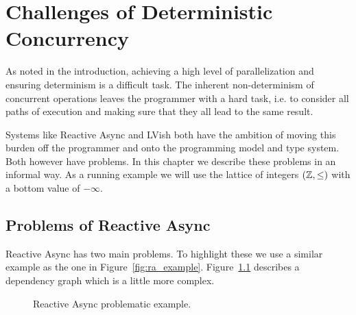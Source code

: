 \chapter{Challenges of Deterministic Concurrency}
\label{cha:challenges}





As noted in the introduction, achieving a high level of parallelization and
ensuring determinism is a difficult task. The inherent non-determinism of
concurrent operations leaves the programmer with a hard task, i.e. to consider
all paths of execution and making sure that they all lead to the same result.

Systems like Reactive Async and LVish both have the ambition of moving this
burden off the programmer and onto the programming model and type system. Both
however have problems. In this chapter we describe these problems in an informal
way. As a running example we will use the lattice of integers $(\mathbb{Z},
\leq)$ with a bottom value of $-\infty$.

\section{Problems of Reactive Async}%
\label{sec:problems_of_reactive_async}

Reactive Async has two main problems. To highlight these we use a similar
example as the one in Figure~\ref{fig:ra_example}. Figure~\ref{fig:ra_example2}
describes a dependency graph which is a little more complex.

\begin{figure}
  \centering
  \caption{Reactive Async problematic example.}
  \label{fig:ra_example2}
\end{figure}

